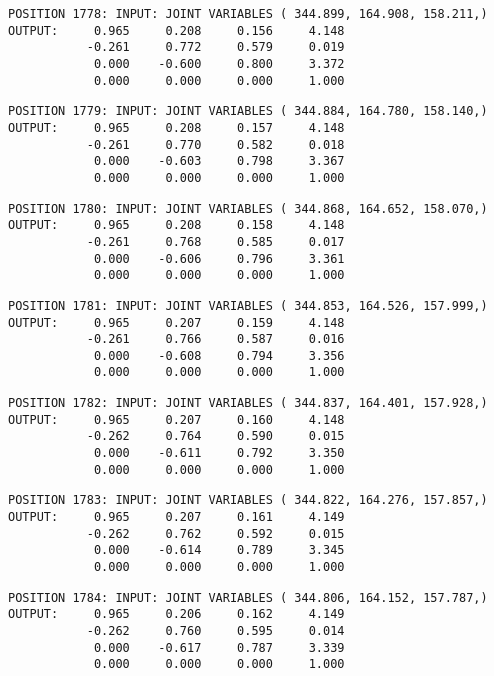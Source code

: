 \begin{verbatim}
POSITION 1778: INPUT: JOINT VARIABLES ( 344.899, 164.908, 158.211,)
OUTPUT:     0.965     0.208     0.156     4.148
           -0.261     0.772     0.579     0.019
            0.000    -0.600     0.800     3.372
            0.000     0.000     0.000     1.000
\end{verbatim} \pagebreak[1]\begin{verbatim}
POSITION 1779: INPUT: JOINT VARIABLES ( 344.884, 164.780, 158.140,)
OUTPUT:     0.965     0.208     0.157     4.148
           -0.261     0.770     0.582     0.018
            0.000    -0.603     0.798     3.367
            0.000     0.000     0.000     1.000
\end{verbatim} \pagebreak[1]\begin{verbatim}
POSITION 1780: INPUT: JOINT VARIABLES ( 344.868, 164.652, 158.070,)
OUTPUT:     0.965     0.208     0.158     4.148
           -0.261     0.768     0.585     0.017
            0.000    -0.606     0.796     3.361
            0.000     0.000     0.000     1.000
\end{verbatim} \pagebreak[1]\begin{verbatim}
POSITION 1781: INPUT: JOINT VARIABLES ( 344.853, 164.526, 157.999,)
OUTPUT:     0.965     0.207     0.159     4.148
           -0.261     0.766     0.587     0.016
            0.000    -0.608     0.794     3.356
            0.000     0.000     0.000     1.000
\end{verbatim} \pagebreak[1]\begin{verbatim}
POSITION 1782: INPUT: JOINT VARIABLES ( 344.837, 164.401, 157.928,)
OUTPUT:     0.965     0.207     0.160     4.148
           -0.262     0.764     0.590     0.015
            0.000    -0.611     0.792     3.350
            0.000     0.000     0.000     1.000
\end{verbatim} \pagebreak[1]\begin{verbatim}
POSITION 1783: INPUT: JOINT VARIABLES ( 344.822, 164.276, 157.857,)
OUTPUT:     0.965     0.207     0.161     4.149
           -0.262     0.762     0.592     0.015
            0.000    -0.614     0.789     3.345
            0.000     0.000     0.000     1.000
\end{verbatim} \pagebreak[1]\begin{verbatim}
POSITION 1784: INPUT: JOINT VARIABLES ( 344.806, 164.152, 157.787,)
OUTPUT:     0.965     0.206     0.162     4.149
           -0.262     0.760     0.595     0.014
            0.000    -0.617     0.787     3.339
            0.000     0.000     0.000     1.000
\end{verbatim} \pagebreak[1]\begin{verbatim}

\end{verbatim}
